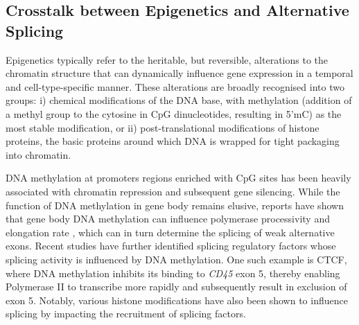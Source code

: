 \newpage
\subsection{Crosstalk between Epigenetics and Alternative Splicing}
Epigenetics typically refer to the heritable, but reversible, alterations to the chromatin structure that can dynamically influence gene expression in a temporal and cell-type-specific manner. These alterations are broadly recognised into two groups\cite{Docherty2008}: i) chemical modifications of the DNA base, with methylation (addition of a methyl group to the cytosine in CpG dinucleotides, resulting in 5'mC) as the most stable modification, or ii) post-translational modifications of histone proteins, the basic proteins around which DNA is wrapped for tight packaging into chromatin.      

DNA methylation at promoters regions enriched with CpG sites has been heavily associated with chromatin repression and subsequent gene silencing. While the function of DNA methylation in gene body remains elusive, reports have shown that gene body DNA methylation can influence polymerase processivity and elongation rate \cite{Yang2014}, which can in turn determine the splicing of weak alternative exons. Recent studies have further identified splicing regulatory factors whose splicing activity is influenced by DNA methylation\cite{Shukla2011}. One such example is CTCF, where DNA methylation inhibits its binding to \textit{CD45} exon 5, thereby enabling Polymerase II to transcribe more rapidly and subsequently result in exclusion of exon 5\cite{Shukla2011}. Notably, various histone modifications have also been shown to influence splicing by impacting the recruitment of splicing factors\cite{Zhang2020a, Luco2011}.

\newpage
